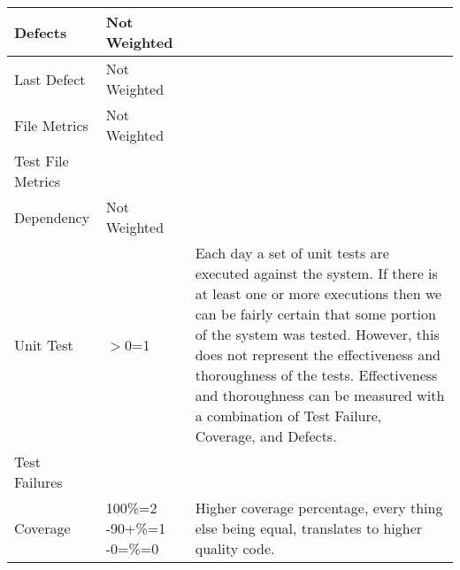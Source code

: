 \begin{table}[htbp]
\begin{center}
\begin{tabular}{|p{2.5cm}|p{3.0cm}|p{8.0cm}|}
\small{}Defects & \small{}Not Weighted & \small{} \\ \hline
\small{}Last Defect & \small{}Not Weighted & \small{} \\ \hline

\small{}File Metrics & \small{}Not Weighted & \small{} \\ \hline
\small{}Test File Metrics & \small{} & \small{} \\ \hline

\small{}Dependency & \small{}Not Weighted & \small{} \\ \hline

\small{}Unit Test & \small{}$>$0=1 & \small{}Each day a set of unit tests
are executed against the system. If there is at least one or more
executions then we can be fairly certain that some portion of the system
was tested. However, this does not represent the effectiveness and
thoroughness of the tests. Effectiveness and thoroughness can be measured
with a combination of Test Failure, Coverage, and Defects.\\ \hline

\small{}Test Failures & \small{} & \small{} \\ \hline

\small{}Coverage & \small{}100\%=2 \newline 99-90+\%=1 \newline 89-0=\%=0 &
\small{}Higher coverage percentage, every thing else being equal,
translates to higher quality code. \\ \hline

    \end{tabular}
  \end{center}
\end{table}



